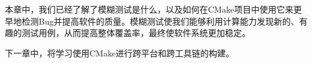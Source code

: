 
本章中，我们已经了解了模糊测试是什么，以及如何在CMake项目中使用它来更早地检测Bug并提高软件的质量。模糊测试使我们能够利用计算能力发现新的、有趣的测试用例，从而提高整体覆盖率，最终使软件系统更加稳定。

下一章中，将学习使用CMake进行跨平台和跨工具链的构建。